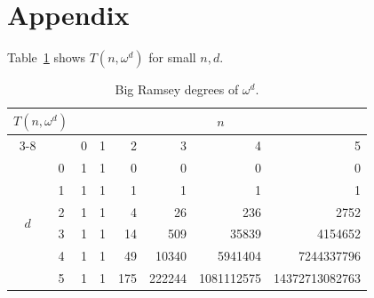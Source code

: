 \documentclass[10pt,a4paper]{article}
\newcommand{\om}{\omega}
\newcommand{\numpoints}{n}
\theoremstyle{plain}
\theoremstyle{definition}
\begin{document}
\section*{Appendix}
Table~\ref{tab:om-d-a} shows $T(\numpoints,\om^d)$ for small $\numpoints,d$.
\begin{table}[htpb]
\centering
\begin{tabular}{| c | c | r | r | r | r | r | r|}
    \hline
     \multicolumn{2}{|c|}{\multirow{2}{*}{$T(n,\om^d)$}}&\multicolumn{6}{c|}{$\numpoints$}\\\cline{3-8}
     \multicolumn{1}{|c}{}&&0&1&2&3&4&5\\\hline
     \multirow{6}{*}{$d$}&0&1&1&0&0&0&0\\\cline{2-8}
     &1&1&1&1&1&1&1\\\cline{2-8}
     &2&1&1&4&26&236&2752\\\cline{2-8}
     &3&1&1&14&509&35839&4154652\\\cline{2-8}
     &4&1&1&49&10340&5941404&7244337796\\\cline{2-8}
     &5&1&1&175&222244&1081112575&14372713082763\\\hline
\end{tabular}
\caption{Big Ramsey degrees of $\om^d$.}
\label{tab:om-d-a}
\end{table}
\end{document}
